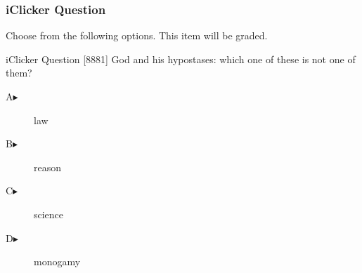 \begin{frame}
  \frametitle{iClicker Question}
Choose from the following options. This item will be graded.
\begin{block}{iClicker Question}
[8881] God and his hypostases: which one of these is not one of them?
\end{block}
\begin{description}
\item[A\hspace{.2in}$\blacktriangleright$] law
\item[B\hspace{.2in}$\blacktriangleright$] reason
\item[C\hspace{.2in}$\blacktriangleright$] science
\item[D\hspace{.2in}$\blacktriangleright$] monogamy
\end{description}
\end{frame}
